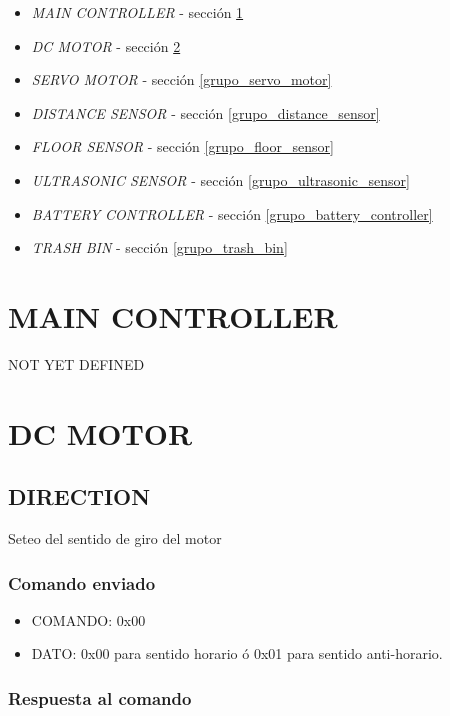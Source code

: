 \documentclass[a4paper,11pt]{article}
\begin{document}
\begin{itemize}
	\item \emph{MAIN CONTROLLER} - secci\'on \ref{grupo_main_controller}
	\item \emph{DC MOTOR} - secci\'on \ref{grupo_dc_motor}
	\item \emph{SERVO MOTOR} - secci\'on \ref{grupo_servo_motor}
	\item \emph{DISTANCE SENSOR} - secci\'on \ref{grupo_distance_sensor}
	\item \emph{FLOOR SENSOR} - secci\'on \ref{grupo_floor_sensor}
	\item \emph{ULTRASONIC SENSOR} - secci\'on \ref{grupo_ultrasonic_sensor}
	\item \emph{BATTERY CONTROLLER} - secci\'on \ref{grupo_battery_controller}
	\item \emph{TRASH BIN} - secci\'on \ref{grupo_trash_bin}
\label{grupos_listado}
\end{itemize}

\section{MAIN CONTROLLER}
\label{grupo_main_controller}

NOT YET DEFINED

\section{DC MOTOR}
\label{grupo_dc_motor}

\subsection{DIRECTION}
\label{direction}

Seteo del sentido de giro del motor

\subsubsection*{Comando enviado}
\label{direction_comando_enviado}

\begin{itemize}
	\item{COMANDO:} 0x00
	\item{DATO:} 0x00 para sentido horario \'o 0x01 para sentido anti-horario.
\end{itemize}

\subsubsection*{Respuesta al comando}
\label{direction_respuesta}
\end{document}
